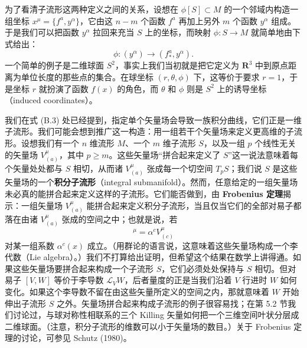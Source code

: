为了看清子流形这两种定义之间的关系，设想在 $\phi[S] \subset M$ 的一个邻域内构造一组坐标 $x^\mu = \{f^a, y^\alpha\}$，它由这 $n - m$ 个函数 $f^a$ 再加上另外 $m$ 个函数 $y^\alpha$ 组成。于是我们可以把函数 $y^\alpha$ 拉回来充当 $S$ 上的坐标，而映射 $\phi : S \to M$ 就简单地由下式给出：
\begin{equation*}
\phi : (y^\alpha) \to (f^a_*, y^\alpha).
\tag{C.2}
\end{equation*}
一个简单的例子是二维球面 $S^2$，事实上我们当初就是把它定义为 $\mathbf{R}^3$ 中到原点距离为单位长度的那些点的集合。在球坐标 $(r, \theta, \phi)$ 下，这等价于要求 $r = 1$，于是坐标 $r$ 就扮演了函数 $f(x)$ 的角色，而 $\theta$ 和 $\phi$ 则是 $S^2$ 上的诱导坐标（induced coordinates）。

我们在式 (B.3) 处已经提到，指定单个矢量场会导致一族积分曲线，它们正是一维子流形。我们可能会想到推广这一构造：用一组若干个矢量场来定义更高维的子流形。设想我们有一个 $n$ 维流形 $M$、一个 $m$ 维子流形 $S$，以及一组 $p$ 个线性无关的矢量场 $V^\mu_{(a)}$，其中 $p \geq m$。这些矢量场“拼合起来定义了 $S$”这一说法意味着每个矢量处处都与 $S$ 相切，从而诸 $V^\mu_{(a)}$ 张成每一个切空间 $T_pS$；我们说 $S$ 是这些矢量场的一个\textbf{积分子流形}（integral submanifold）。然而，任意给定的一组矢量场未必真的能拼合起来定义这样的子流形。它们能否做到，由 \textbf{Frobenius 定理}揭示：一组矢量场 $V^\mu_{(a)}$ 能拼合起来定义积分子流形，当且仅当它们的全部对易子都落在由诸 $V^\mu_{(a)}$ 张成的空间之中；也就是说，若
\begin{equation*}
[V_{(a)}, V_{(b)}]^\mu = \alpha^c V^\mu_{(c)}
\tag{C.3}
\end{equation*}
对某一组系数 $\alpha^c(x)$ 成立。（用群论的语言说，这意味着这些矢量场构成一个李代数（Lie algebra）。）我们不打算给出证明，但希望这个结果在数学上讲得通。如果这些矢量场要拼合起来构成一个子流形 $S$，它们必须处处保持与 $S$ 相切。但对易子 $[V, W]$ 等价于李导数 $\mathcal{L}_V W$，后者量度的正是当我们沿着 $V$ 行进时 $W$ 如何变化。如果这个李导数不留在由这些矢量所定义的空间之内，那就意味着 $W$ 开始伸出子流形 $S$ 之外。矢量场拼合起来构成子流形的例子很容易找；在第 5.2 节我们讨论过，与球对称性相联系的三个 Killing 矢量如何把一个三维空间叶状分层成二维球面。（注意，积分子流形的维数可以小于矢量场的数目。）关于 Frobenius 定理的讨论，可参见 Schutz (1980)。

